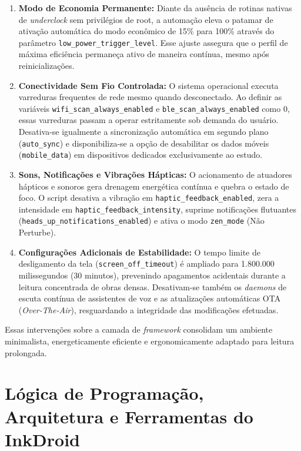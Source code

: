 \documentclass[
    12pt,
    openright,
    oneside,
    a4paper,
    english,
    brazilian
    ]{abntex2}
\begin{document}
\begin{enumerate}
  \item \textbf{Modo de Economia Permanente:} Diante da ausência de rotinas nativas de \textit{underclock} sem privilégios de root, a automação eleva o patamar de ativação automática do modo econômico de 15\% para 100\% através do parâmetro \texttt{low\_power\_trigger\_level}. Esse ajuste assegura que o perfil de máxima eficiência permaneça ativo de maneira contínua, mesmo após reinicializações.

  \item \textbf{Conectividade Sem Fio Controlada:} O sistema operacional executa varreduras frequentes de rede mesmo quando desconectado. Ao definir as variáveis \texttt{wifi\_scan\_always\_enabled} e \texttt{ble\_scan\_always\_enabled} como 0, essas varreduras passam a operar estritamente sob demanda do usuário. Desativa-se igualmente a sincronização automática em segundo plano (\texttt{auto\_sync}) e disponibiliza-se a opção de desabilitar os dados móveis (\texttt{mobile\_data}) em dispositivos dedicados exclusivamente ao estudo.

  \item \textbf{Sons, Notificações e Vibrações Hápticas:} O acionamento de atuadores hápticos e sonoros gera drenagem energética contínua e quebra o estado de foco. O script desativa a vibração em \texttt{haptic\_feedback\_enabled}, zera a intensidade em \texttt{haptic\_feedback\_intensity}, suprime notificações flutuantes (\texttt{heads\_up\_notifications\_enabled}) e ativa o modo \texttt{zen\_mode} (Não Perturbe).

  \item \textbf{Configurações Adicionais de Estabilidade:} O tempo limite de desligamento da tela (\texttt{screen\_off\_timeout}) é ampliado para 1.800.000 milissegundos (30 minutos), prevenindo apagamentos acidentais durante a leitura concentrada de obras densas. Desativam-se também os \textit{daemons} de escuta contínua de assistentes de voz e as atualizações automáticas OTA (\textit{Over-The-Air}), resguardando a integridade das modificações efetuadas.
\end{enumerate}

Essas intervenções sobre a camada de \textit{framework} consolidam um ambiente minimalista, energeticamente eficiente e ergonomicamente adaptado para leitura prolongada.


\section{Lógica de Programação, Arquitetura e Ferramentas do InkDroid}
\end{document}
